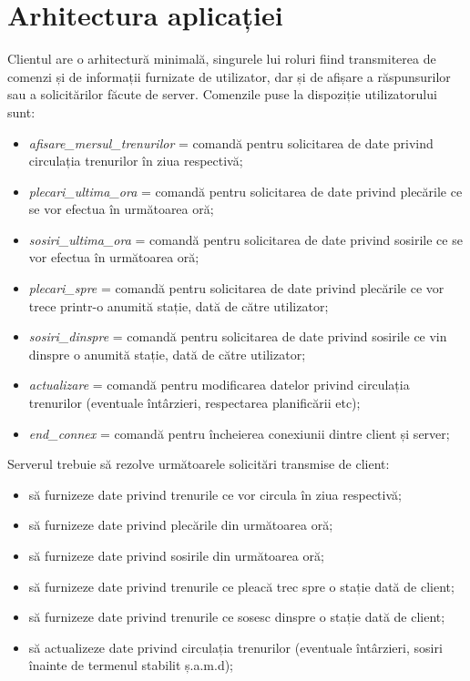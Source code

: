 \documentclass[runningheads]{llncs}
\begin{document}
\section{Arhitectura aplicației}
Clientul are o arhitectură minimală, singurele lui roluri fiind transmiterea de comenzi și de informații furnizate de utilizator, dar și de afișare a răspunsurilor sau a solicitărilor făcute de server. Comenzile puse la dispoziție utilizatorului sunt:
\begin{itemize}
    \item \textit{afisare\_mersul\_trenurilor} = comandă pentru solicitarea de date privind circulația trenurilor în ziua respectivă;
    \item \textit{plecari\_ultima\_ora} = comandă pentru solicitarea de date privind plecările ce se vor efectua în următoarea oră;
    \item \textit{sosiri\_ultima\_ora} = comandă pentru solicitarea de date privind sosirile ce se vor efectua în următoarea oră;
    \item \textit{plecari\_spre} = comandă pentru solicitarea de date privind plecările ce vor trece printr-o anumită stație, dată de către utilizator;
    \item \textit{sosiri\_dinspre} = comandă pentru solicitarea de date privind sosirile ce vin dinspre o anumită stație, dată de către utilizator;
    \item \textit{actualizare} = comandă pentru modificarea datelor privind circulația trenurilor (eventuale întârzieri, respectarea planificării etc);
    \item  \textit{end\_connex} =  comandă pentru încheierea conexiunii dintre client și server;
\end{itemize}
Serverul trebuie să rezolve următoarele solicitări transmise de client:
\begin{itemize}
    \item să furnizeze date privind trenurile ce vor circula în ziua respectivă;
    \item să furnizeze date privind plecările din următoarea oră;
    \item să furnizeze date privind sosirile din următoarea oră;
    \item să furnizeze date privind trenurile ce pleacă trec spre o stație dată de client;
    \item să furnizeze date privind trenurile ce sosesc dinspre o stație dată de client;
    \item să actualizeze date privind circulația trenurilor (eventuale întârzieri, sosiri înainte de termenul stabilit ș.a.m.d);
\end{itemize}
\end{document}
